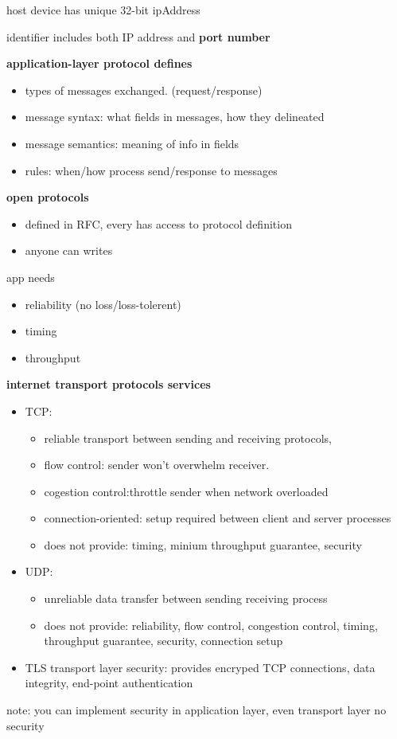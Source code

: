 \documentclass[10pt]{article}
\theoremstyle{break}
\begin{document}
host device has unique 32-bit ipAddress 

identifier includes both IP address and \textbf{port number}

\textbf{application-layer protocol defines}
\begin{itemize}
    \item types of messages exchanged. (request/response)
    \item message syntax: what fields in messages, how they delineated
    \item message semantics: meaning of info in fields
    \item rules: when/how process send/response to messages 
\end{itemize}

\textbf{open protocols}

\begin{itemize}
    \item defined in RFC, every has access to protocol definition
    \item anyone can writes
\end{itemize}

app needs 
\begin{itemize}
    \item reliability (no loss/loss-tolerent)
    \item timing
    \item throughput
\end{itemize}

\textbf{internet transport protocols services}
\begin{itemize}
    \item TCP: \begin{itemize}
        \item reliable transport between sending and receiving protocols,
        \item flow control: sender won't overwhelm receiver. 
        \item cogestion control:throttle sender when network overloaded
        \item connection-oriented: setup required between client and server processes
        \item does not provide: timing, minium throughput guarantee, security
    \end{itemize} 
    \item UDP: \begin{itemize}
        \item unreliable data transfer between sending receiving process 
        \item does not provide: reliability, flow control, congestion control, timing, throughput guarantee, security, connection setup
    \end{itemize}
    \item TLS transport layer security: provides encryped TCP connections, data integrity, end-point authentication
\end{itemize}
    note: you can implement security in application layer, even transport layer no security
\end{document}
